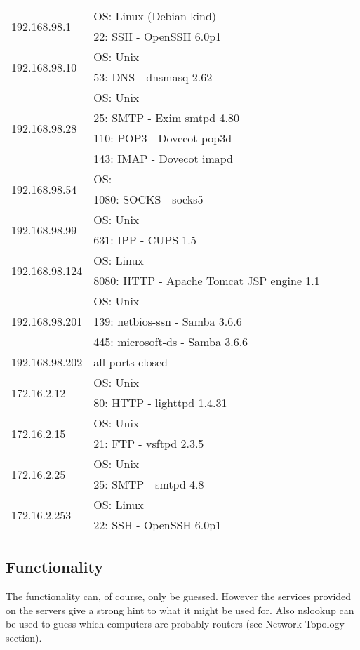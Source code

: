 \documentclass[12pt,a4paper,titlepage,oneside]{scrartcl}
\begin{document}
\begin{tabular}{l | l}
\hline
\multirow{2}{*}{192.168.98.1} & OS: Linux (Debian kind) \bigstrut \\ & 22: SSH - OpenSSH 6.0p1 \bigstrut \\ \hline
\multirow{2}{*}{192.168.98.10} & OS: Unix \bigstrut  \\ &  53: DNS - dnsmasq 2.62 \bigstrut \\ \hline
\multirow{4}{*}{192.168.98.28} &OS: Unix \bigstrut \\ & 25: SMTP - Exim smtpd 4.80 \bigstrut \\ & 110: POP3 - Dovecot pop3d \bigstrut \\  & 143: IMAP - Dovecot imapd \bigstrut \\ \hline
\multirow{2}{*}{192.168.98.54} & OS: \bigstrut \\ & 1080: SOCKS - socks5 \bigstrut \\ \hline
\multirow{2}{*}{192.168.98.99} & OS: Unix \bigstrut \\ & 631: IPP - CUPS 1.5 \bigstrut \\ \hline
\multirow{2}{*}{192.168.98.124} & OS: Linux \bigstrut \\ & 8080: HTTP - Apache Tomcat JSP engine 1.1 \bigstrut \\ \hline
\multirow{3}{*}{192.168.98.201} & OS: Unix \bigstrut \\ & 139: netbios-ssn - Samba 3.6.6 \bigstrut \\ & 445: microsoft-ds - Samba 3.6.6 \bigstrut \\ \hline
192.168.98.202 & all ports closed  \bigstrut \\ \hline
\multirow{2}{*}{172.16.2.12} & OS: Unix \bigstrut \\ & 80: HTTP - lighttpd 1.4.31 \bigstrut \\ \hline
\multirow{2}{*}{172.16.2.15} & OS: Unix \bigstrut \\ & 21: FTP - vsftpd 2.3.5 \bigstrut \\ \hline
\multirow{2}{*}{172.16.2.25} & OS: Unix \bigstrut \\ & 25: SMTP - smtpd 4.8 \bigstrut \\ \hline
\multirow{2}{*}{172.16.2.253} & OS: Linux \bigstrut \\ & 22: SSH - OpenSSH 6.0p1 \bigstrut \\ \hline
\end{tabular}

\newpage
\subsection{Functionality}
The functionality can, of course, only be guessed. However the services provided on the servers give a strong hint to what it might be used for. Also nslookup can be used to guess which computers are probably routers (see Network Topology section).
 
\end{document}
